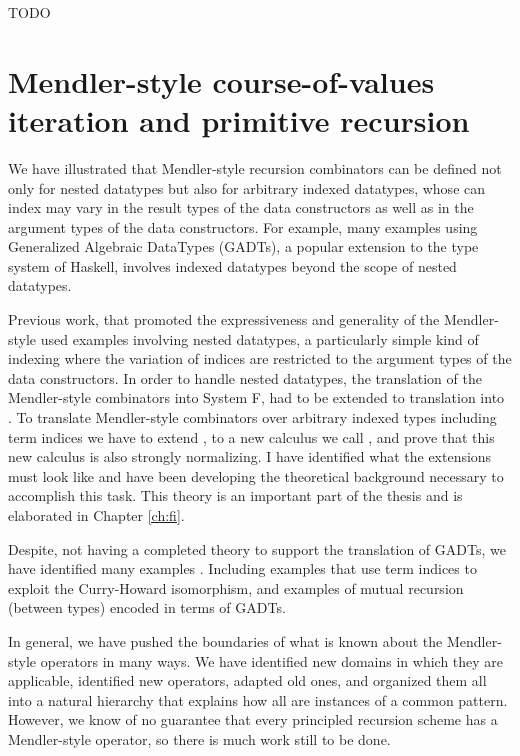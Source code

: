 TODO




\section{Mendler-style course-of-values iteration and primitive recursion}
\label{sec:mcv}

We \cite{AhnShe11} have illustrated that Mendler-style recursion combinators
can be defined not only for nested datatypes but also for arbitrary indexed
datatypes, whose can index may vary in the result types of the
data constructors as well as in the argument types of the data constructors.
For example, many examples using Generalized Algebraic DataTypes (GADTs),
a popular extension to the type system of Haskell, involves indexed datatypes
beyond the scope of nested datatypes.

Previous work, that promoted the expressiveness and generality of
the Mendler-style \cite{AbeMatUus03,AbeMatUus05,AbeMat04} used examples
involving nested datatypes, a particularly simple kind of indexing
where the variation of indices are restricted to the argument types of
the data constructors. In order to handle nested datatypes, the translation of
the Mendler-style combinators into System \textsf{F}, had to be extended to
translation into \Fw. To translate Mendler-style combinators over arbitrary
indexed types including term indices we have to extend \Fw, to a new calculus
we call \Fi, and prove that this new calculus is also strongly normalizing.
I have identified what the extensions must look like and have been developing
the theoretical background necessary to accomplish this task.
This theory is an important part of the thesis and is elaborated in
Chapter \ref{ch:fi}.

Despite, not having a completed theory to support the translation of GADTs,
we have identified many examples \cite{AhnShe11}. Including examples
that use term indices to exploit the Curry-Howard isomorphism, and
examples of mutual recursion (between types) encoded in terms of GADTs.

In general, we have pushed the boundaries of what is known about
the Mendler-style operators in many ways. We have identified new domains
in which they are applicable, identified new operators, adapted old ones,
and organized them all into a natural hierarchy that explains how all are
instances of a common pattern. However, we know of no guarantee that every
principled recursion scheme has a Mendler-style operator, so there is
much work still to be done.



